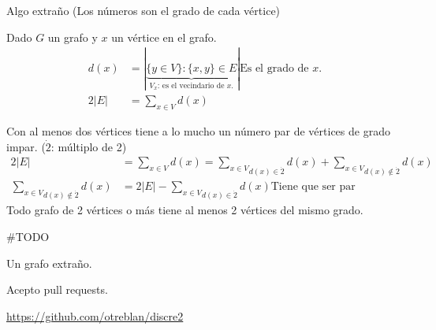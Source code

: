 \documentclass[../main.tex]{subfiles}
\begin{document}
Algo extraño (Los números son el grado de cada vértice)
\begin{figure}[H]
	\centering
	
\end{figure}

Dado $G$ un grafo y $x$ un vértice en el grafo.
\begin{align*}
	d(x) &=
	\left|
		\underbrace
		{
			\{y\in V\}: \{x,y\}\in E
		}_
		{
			\text{$V_x$: es el vecindario de $x$.}
		}
	\right|
	\text{Es el grado de $x$.}\\
	2|E| &= \sum_{x\in V}d(x)
\end{align*}

\begin{figure}[H]
	\centering
	
\end{figure}

{Con al menos dos vértices}
tiene a lo mucho un número par de vértices de grado impar.
($\dot{2}$: múltiplo de 2)
\begin{align*}
	2|E| &=
	\sum_{x\in V}d(x)
	=
	\underset
	{
		d(x)\in \dot{2}
	}
	{
		\sum_{x\in V}
	}
	d(x)
	+
	\underset
	{
		d(x)\notin \dot{2}
	}
	{
		\sum_{x\in V}
	}d(x)\\
	\underset
	{
		d(x)\notin \dot{2}
	}
	{
		\sum_{x\in V}
	}
	d(x)
	&=
	2|E|
	-
	\underset
	{
		d(x)\in \dot{2}
	}
	{
		\sum_{x\in V}
	}
	d(x)
	\text{Tiene que ser par}
\end{align*}
Todo grafo de 2 vértices o más tiene al menos 2 vértices del mismo grado.

{
	\centering
	\bfseries

	\#TODO

	Un grafo extraño.

	Acepto pull requests.

	\url{https://github.com/otreblan/discre2}

}
\end{document}
